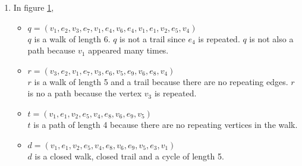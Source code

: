 \begin{enumerate}
\begin{figure}[h]
\label{walkfig}
\end{figure}
\item[] In figure \ref{walkfig},
\begin{itemize}
\item $q=(v_1,e_2,v_3,e_7,v_1,e_4,v_6,e_4,v_1,e_1,v_2,e_5,v_4)$\\ $q$ is a walk of length 6. $q$ is not a trail since $e_4$ is repeated. $q$ is not also a path because $v_1$ appeared many times.
\item $r=(v_3,e_2,v_1,e_7,v_3,e_6,v_5,e_9,v_6,e_8,v_4)$ \\ $r$ is a walk of length 5 and a trail because there are no repeating edges. $r$ is no a path because the vertex $v_3$ is repeated.
\item $t=(v_1,e_1,v_2,e_5,v_4,e_8,v_6,e_9,v_5)$ \\ $t$ is a path of length 4 because there are no repeating vertices in the walk.
\item $d=(v_1,e_1,v_2,e_5,v_4,e_8,v_6,e_9,v_5,e_3,v_1)$ \\ $d$ is a closed walk, closed trail and a cycle of length 5.
\end{itemize}

\end{enumerate}



